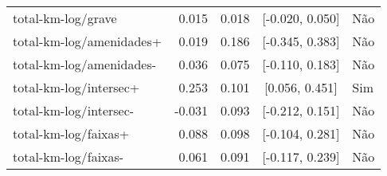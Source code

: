 \begin{longtable}{lrrcl}
total-km-log/grave & 0.015 & 0.018 & {}[-0.020, 0.050] & Não\\
total-km-log/amenidades+ & 0.019 & 0.186 & {}[-0.345, 0.383] & Não\\
total-km-log/amenidades- & 0.036 & 0.075 & {}[-0.110, 0.183] & Não\\
total-km-log/intersec+ & 0.253 & 0.101 & {}[0.056, 0.451] & Sim\\
total-km-log/intersec- & -0.031 & 0.093 & {}[-0.212, 0.151] & Não\\
total-km-log/faixas+ & 0.088 & 0.098 & {}[-0.104, 0.281] & Não\\
total-km-log/faixas- & 0.061 & 0.091 & {}[-0.117, 0.239] & Não\\*
\end{longtable}
